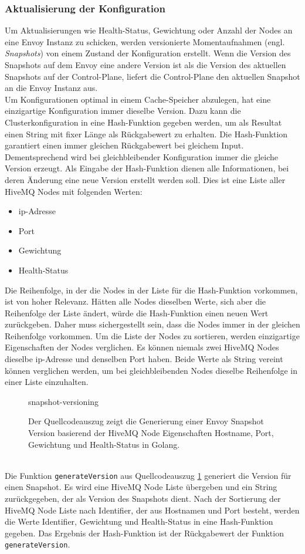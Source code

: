 \subsubsection{Aktualisierung der Konfiguration}
Um Aktualisierungen wie Health-Status, Gewichtung oder Anzahl der Nodes an eine Envoy Instanz zu schicken, werden versionierte Momentaufnahmen (engl. \textit{Snapshots}) von einem Zustand der Konfiguration erstellt. Wenn die Version des Snapshots auf dem Envoy eine andere Version ist als die Version des aktuellen Snapshots auf der Control-Plane, liefert die Control-Plane den aktuellen Snapshot an die Envoy Instanz aus.
\\
Um Konfigurationen optimal in einem Cache-Speicher abzulegen, hat eine einzigartige Konfiguration immer dieselbe Version.
Dazu kann die Clusterkonfiguration in eine Hash-Funktion gegeben werden, um als Resultat einen String mit fixer Länge als Rückgabewert zu erhalten.
Die Hash-Funktion garantiert einen immer gleichen Rückgabewert bei gleichem Input. Dementsprechend wird bei gleichbleibender Konfiguration immer die gleiche Version erzeugt.
Als Eingabe der Hash-Funktion dienen alle Informationen, bei deren Änderung eine neue Version erstellt werden soll. Dies ist eine Liste aller HiveMQ Nodes mit folgenden Werten:
\begin{itemize}
  \item \ac{ip}-Adresse
  \item Port
  \item Gewichtung
  \item Health-Status
\end{itemize}
Die Reihenfolge, in der die Nodes in der Liste für die Hash-Funktion vorkommen, ist von hoher Relevanz.
Hätten alle Nodes dieselben Werte, sich aber die Reihenfolge der Liste ändert, würde die Hash-Funktion einen neuen Wert zurückgeben.
Daher muss sichergestellt sein, dass die Nodes immer in der gleichen Reihenfolge vorkommen.
Um die Liste der Nodes zu sortieren, werden einzigartige Eigenschaften der Nodes verglichen.
Es können niemals zwei HiveMQ Nodes dieselbe \ac{ip}-Adresse und denselben Port haben. Beide Werte als String vereint können verglichen werden, um bei gleichbleibenden Nodes dieselbe Reihenfolge in einer Liste einzuhalten.
\begin{figure}
    {snapshot-versioning}
    \caption{Der Quellcodeauszug zeigt die Generierung einer Envoy Snapshot Version basierend der HiveMQ Node Eigenschaften Hostname, Port, Gewichtung und Health-Status in Golang.}
    \label{code:snapshot-versioning}
\end{figure}
\\
Die Funktion \verb|generateVersion| aus Quellcodeauszug \ref{code:snapshot-versioning} generiert die Version für einen Snapshot. Es wird eine HiveMQ Node Liste übergeben und ein String zurückgegeben, der als Version des Snapshots dient. Nach der Sortierung der HiveMQ Node Liste nach Identifier, der aus Hostnamen und Port besteht, werden die Werte Identifier, Gewichtung und Health-Status in eine Hash-Funktion gegeben. Das Ergebnis der Hash-Funktion ist der Rückgabewert der Funktion \verb|generateVersion|.
\newpage

